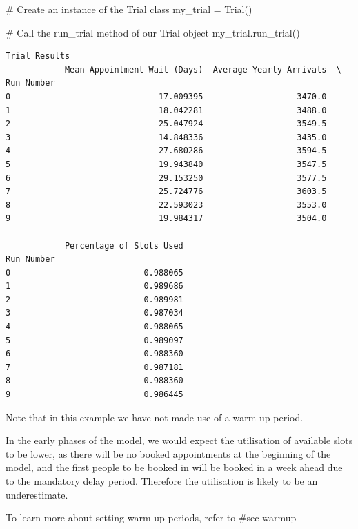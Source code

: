 \documentclass[
  letterpaper,
  DIV=11,
  numbers=noendperiod]{scrreprt}
\newenvironment{Shaded}{\begin{snugshade}}{\end{snugshade}}
\newcommand{\CommentTok}[1]{\textcolor[rgb]{0.37,0.37,0.37}{#1}}
\newcommand{\NormalTok}[1]{\textcolor[rgb]{0.00,0.23,0.31}{#1}}
\newcommand{\OperatorTok}[1]{\textcolor[rgb]{0.37,0.37,0.37}{#1}}
\begin{document}
\begin{Shaded}
\begin{Highlighting}[]
\CommentTok{\# Create an instance of the Trial class}
\NormalTok{my\_trial }\OperatorTok{=}\NormalTok{ Trial()}

\CommentTok{\# Call the run\_trial method of our Trial object}
\NormalTok{my\_trial.run\_trial()}
\end{Highlighting}
\end{Shaded}

\begin{verbatim}
Trial Results
            Mean Appointment Wait (Days)  Average Yearly Arrivals  \
Run Number                                                          
0                              17.009395                   3470.0   
1                              18.042281                   3488.0   
2                              25.047924                   3549.5   
3                              14.848336                   3435.0   
4                              27.680286                   3594.5   
5                              19.943840                   3547.5   
6                              29.153250                   3577.5   
7                              25.724776                   3603.5   
8                              22.593023                   3553.0   
9                              19.984317                   3504.0   

            Percentage of Slots Used  
Run Number                            
0                           0.988065  
1                           0.989686  
2                           0.989981  
3                           0.987034  
4                           0.988065  
5                           0.989097  
6                           0.988360  
7                           0.987181  
8                           0.988360  
9                           0.986445  
\end{verbatim}

\begin{tcolorbox}[enhanced jigsaw, rightrule=.15mm, colback=white, colframe=quarto-callout-important-color-frame, colbacktitle=quarto-callout-important-color!10!white, toprule=.15mm, coltitle=black, opacityback=0, titlerule=0mm, bottomtitle=1mm, breakable, title=\textcolor{quarto-callout-important-color}{\faExclamation}\hspace{0.5em}{Important}, opacitybacktitle=0.6, toptitle=1mm, arc=.35mm, bottomrule=.15mm, leftrule=.75mm, left=2mm]

Note that in this example we have not made use of a warm-up period.

In the early phases of the model, we would expect the utilisation of
available slots to be lower, as there will be no booked appointments at
the beginning of the model, and the first people to be booked in will be
booked in a week ahead due to the mandatory delay period. Therefore the
utilisation is likely to be an underestimate.

To learn more about setting warm-up periods, refer to \#sec-warmup

\end{tcolorbox}
\end{document}
